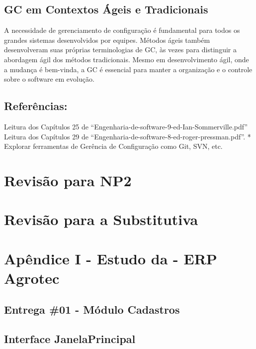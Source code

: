 \documentclass[
]{book}
\begin{document}
\section{GC em Contextos Ágeis e Tradicionais}\label{gc-em-contextos-uxe1geis-e-tradicionais}

A necessidade de gerenciamento de configuração é fundamental para todos os grandes sistemas desenvolvidos por equipes. Métodos ágeis também desenvolveram suas próprias terminologias de GC, às vezes para distinguir a abordagem ágil dos métodos tradicionais. Mesmo em desenvolvimento ágil, onde a mudança é bem-vinda, a GC é essencial para manter a organização e o controle sobre o software em evolução.

\section{Referências:}\label{referuxeancias}

Leitura dos Capítulos 25 de ``Engenharia-de-software-9-ed-Ian-Sommerville.pdf'' Leitura dos Capítulos 29 de ``Engenharia-de-software-8-ed-roger-pressman.pdf''. * Explorar ferramentas de Gerência de Configuração como Git, SVN, etc.

\chapter{Revisão para NP2}\label{revisuxe3o-para-np2}

\chapter{Revisão para a Substitutiva}\label{revisuxe3o-para-a-substitutiva}

\chapter{Apêndice I - Estudo da - ERP Agrotec}\label{apuxeandice-i---estudo-da---erp-agrotec}

\section{Entrega \#01 - Módulo Cadastros}\label{entrega-01---muxf3dulo-cadastros}

\section{Interface JanelaPrincipal}\label{interface-janelaprincipal}
\end{document}
